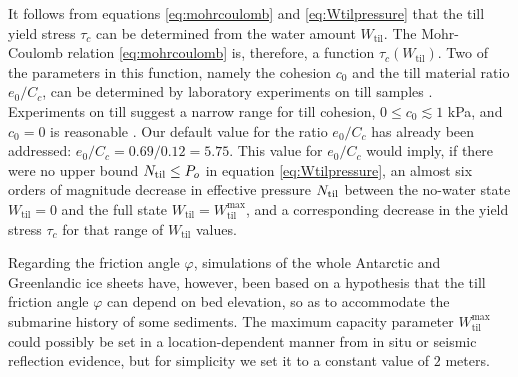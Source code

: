 \documentclass[11pt,final]{amsart}
\newcommand{\Wtil}{W_{\text{til}}}
\newcommand{\Wtilmax}{W_{\text{til}}^{\text{max}}}
\begin{document}
It follows from equations \eqref{eq:mohrcoulomb} and \eqref{eq:Wtilpressure} that the till yield stress $\tau_c$ can be determined from the water amount $\Wtil$.  The Mohr-Coulomb relation \eqref{eq:mohrcoulomb} is, therefore, a function $\tau_c(\Wtil)$.  Two of the parameters in this function, namely the cohesion $c_0$ and the till material ratio $e_0/C_c$, can be determined by laboratory experiments on till samples \citep[e.g.][]{Hookeetal1997,Tulaczyketal2000}.  Experiments on till suggest a narrow range for till cohesion, $0 \le c_0 \lesssim 1$ kPa, and $c_0=0$ is reasonable \citep{Tulaczyketal2000}.   Our default value for the ratio $e_0/C_c$ has already been addressed: $e_0/C_c=0.69/0.12=5.75$.  This value for $e_0/C_c$ would imply, if there were no upper bound $N_{\text{til}} \le P_o$ in equation \eqref{eq:Wtilpressure}, an almost six orders of magnitude decrease in effective pressure $N_{\text{til}}$ between the no-water state $\Wtil=0$ and the full state $\Wtil=\Wtilmax$, and a corresponding decrease in the yield stress $\tau_c$ for that range of $\Wtil$ values.

Regarding the friction angle $\varphi$, simulations of the whole Antarctic \citep{Martinetal2011} and Greenlandic \citep[see supplement]{AschwandenAdalgeirsdottirKhroulev} ice sheets have, however, been based on a hypothesis that the till friction angle $\varphi$ can depend on bed elevation, so as to accommodate the submarine history of some sediments.  The maximum capacity parameter $\Wtilmax$ could possibly be set in a location-dependent manner from in situ \citep{Tulaczyketal2000} or seismic reflection \citep{TrufferHarrisonEchelmeyer2000} evidence, but for simplicity we set it to a constant value of $2$ meters.
\end{document}
